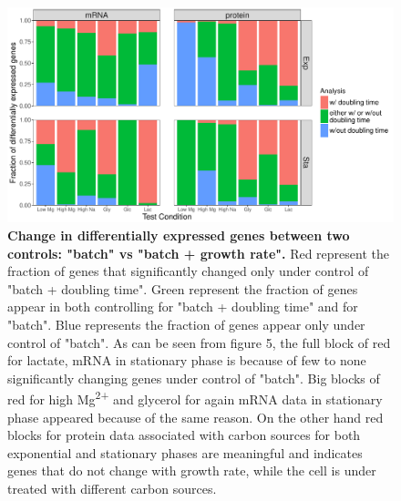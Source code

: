 \documentclass[a4paper]{article}
\begin{document}
\clearpage
\begin{figure}[!htb]
	\includegraphics[width=1\textwidth]{../../c_figures/difference_rtw_GrowthControl.pdf}
	\caption[Change in differentially expressed genes between two controls: "batch" vs "batch + doubling time"]
	{\textbf{Change in differentially expressed genes between two controls: "batch" vs "batch + growth rate".} Red represent the fraction of genes that significantly changed only under control of "batch + doubling time". Green represent the fraction of genes appear in both controlling for "batch + doubling time" and for "batch". Blue represents the fraction of genes appear only under control of "batch". As can be seen from figure 5, the full block of red for lactate, mRNA in stationary phase is because of few to none significantly changing genes under control of "batch". Big blocks of red for high Mg\textsuperscript{2+} and glycerol for again mRNA data in stationary phase appeared because of the same reason. On the other hand red blocks for protein data associated with carbon sources for both exponential and stationary phases are meaningful and indicates genes that do not change with growth rate, while the cell is under treated with different carbon sources.}
\end{figure}
\end{document}
